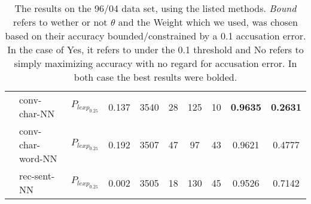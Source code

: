 \begin{table}[]
\begin{tabular}{|c|l|c|c|c|c|c|c|c|c|}
                     & \gls{conv-char-NN}      & $P_{lexp_{0.25}}$ & 0.137    & 3540 & 28  & 125 & 10   & \textbf{0.9635} & \textbf{0.2631} \\ \cline{2-10} 
                     & \gls{conv-char-word-NN} & $P_{lexp_{0.25}}$ & 0.192    & 3507 & 47  & 97  & 43   & 0.9621          & 0.4777          \\ \cline{2-10} 
                     & \gls{rec-sent-NN}       & $P_{lexp_{0.25}}$ & 0.002    & 3505 & 18  & 130 & 45   & 0.9526          & 0.7142          \\ \hline
\end{tabular}
\caption{The results on the 96/04 data set, using the listed methods.
\textit{Bound} refers to wether or not $\theta$ and the Weight which we used,
was chosen based on their accuracy bounded/constrained by a 0.1 accusation error.
In the case of Yes, it refers to under the 0.1 threshold and No refers to simply
maximizing accuracy with no regard for accusation error. In both case
the best results were bolded.}
\label{tab:04_results}
\end{table}
